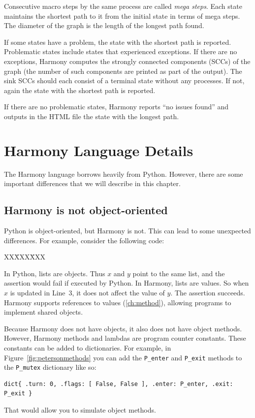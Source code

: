 \documentclass{report}
\newcommand{\harmonysource}[1]{
\begin{tabbing}
XX\=XXX\=XXX\kill
    
\end{tabbing}
}
\newenvironment{code}{
\tcolorbox
}{
\endtcolorbox
}
\begin{document}
Consecutive macro steps by the same process are called \emph{mega steps}.
Each state maintains the shortest path to it from the initial state in terms
of mega steps.
The diameter of the graph is the length of the longest path found.

If some states have a problem, the state with the shortest path is reported.
Problematic states include states that experienced exceptions.
If there are no exceptions, Harmony computes the strongly connected components (SCCs)
of the graph (the number of such components are printed as part of the output).
The sink SCCs should each consist of a terminal state without any processes.
If not, again the state with the shortest path is reported.

If there are no problematic states, Harmony reports ``no issues found'' and outputs
in the HTML file the state with the longest path.

\chapter{Harmony Language Details}
\label{ap:details}

The Harmony language borrows heavily from Python.  However, there are
some important differences that we will describe in this chapter.

\section{Harmony is not object-oriented}

Python is object-oriented, but Harmony is not.  This can lead to some
unexpected differences.  For example, consider the following code:

\begin{code}
\harmonysource{oo}
\end{code}

In Python, lists are objects.  Thus $x$ and $y$ point to the same list,
and the assertion would fail if executed by Python.
In Harmony, lists are values.  So when $x$ is updated in Line~3, it does
not affect the value of $y$.  The assertion succeeds.
Harmony supports references to values (\autoref{ch:method}),
allowing programs to implement shared objects.

Because Harmony does not have objects, it also does not have object methods.
However, Harmony methods and lambdas are program counter constants.
These constants can be added to dictionaries.
For example, in Figure~\ref{fig:petersonmethods}
you can add the \texttt{P\_enter} and
\texttt{P\_exit} methods to the \texttt{P\_mutex} dictionary
like so:
\begin{code}
\begin{verbatim}
dict{ .turn: 0, .flags: [ False, False ], .enter: P_enter, .exit: P_exit }
\end{verbatim}
\end{code}
That would allow you to simulate object methods.
\end{document}
